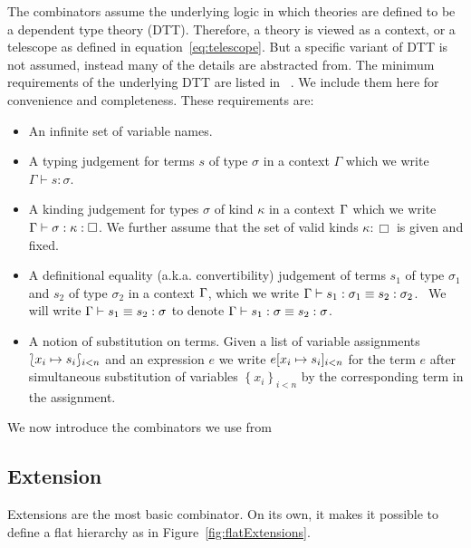 The combinators assume the underlying logic in which theories are defined to be a dependent type theory (DTT). Therefore, a theory is viewed as a context, or a telescope as defined in equation~\ref{eq:telescope}. But a specific variant of DTT is not assumed, instead many of the details are abstracted from. The minimum requirements of the underlying DTT are listed in ~\cite{carette2018building}. We include them here for convenience and completeness. These requirements are:  
\begin{itemize}
    \item An infinite set \vars of variable names.
    
    \item A typing judgement for terms $s$ of type $\sigma$ in a context
    $\Gamma$ which we write $\Gamma \vdash s : \sigma$.
    
    \item A kinding judgement for types $\sigma$ of kind $\kappa$ in a context
    $\Gamma$ which we write\\
    $\Gamma \vdash \sigma : \kappa : \Box$.  We further assume that the set
    of valid kinds $\kappa : \Box$ is given and fixed.
    
    \item A definitional equality (a.k.a. convertibility) judgement of terms
    $s_1$ of type $\sigma_1$ and $s_2$ of type $\sigma_2$ in a context $\Gamma$,
    which we write $\Gamma \vdash s_1 : \sigma_1 \equiv s_2 : \sigma_2$. \ We
    will write $\Gamma \vdash s_1 \equiv s_2 : \sigma$ to denote $\Gamma \vdash
    s_1 : \sigma \equiv s_2 : \sigma$.
    
    \item A notion of substitution on terms. Given a list of variable
    assignments $\lbag x_i \mapsto s_i \rbag_{i < n}$
    and an expression $e$ we write $e[ x_i \mapsto s_i ]_{i < n}$
    for the term $e$ after simultaneous substitution of variables $\left\{ x_i
    \right\}_{i < n}$ by the corresponding term in the assignment.
\end{itemize}

We now introduce the combinators we use from~\cite{carette2018building} 
\subsection{Extension} 
\label{subsec:extension}
Extensions are the most basic combinator. On its own, it makes it possible to define a flat hierarchy as in Figure~\ref{fig:flatExtensions}. 

